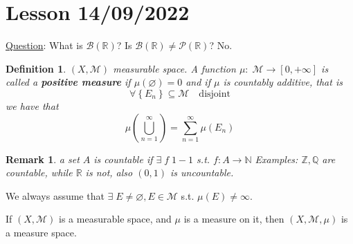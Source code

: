 \documentclass[a4paper,12pt]{article}
\theoremstyle{break}
\newtheorem{remark}[section]{Remark}
\newtheorem{definition}{Definition}[section]
\let\emptyset\varnothing
\newcommand{\boreal}{\mathcal{B}(\mathbb{R})}
\numberwithin{equation}{section}
\begin{document}
\section{Lesson 14/09/2022}
\underline{Question}: What is \(\boreal\)?
Is \(\boreal \not = \mathcal{P}(\mathbb{R})\)? No.
\begin{definition}
    \((X, \mathcal{M})\) measurable space. A function \(\mu : \; \mathcal{M} \to [0, +\infty]\) is called a \textbf{positive measure} if \(\mu(\emptyset) = 0\) and if \(\mu\) is countably additive, that is 
    \[
        \forall \left\lbrace E_n \right\rbrace \subseteq \mathcal{M} \quad \mbox{disjoint}
    \]
    we have that \[
        \mu\left(\bigcup_{n=1}^{\infty}\right) = \sum_{n = 1}^{\infty} \mu(E_n) \tag*{\(\sigma\)-additivity}
    \]
\end{definition}
\begin{remark}
    a set \(A\) is countable if \(\exists \; f \; 1-1\) s.t. \(f: A\to \mathbb{N}\)
Examples: \(\mathbb{Z}, \mathbb{Q}\) are countable, while \(\mathbb{R}\) is not, also \((0,1)\) is uncountable.
\end{remark}
We always assume that \(\exists \; E \not = \emptyset, E \in \mathcal{M}\) s.t. \(\mu(E) \not = \infty\). 

If \((X,\mathcal{M})\) is a measurable space, and \(\mu\) is a measure on it, then \((X, \mathcal{M}, \mu)\) is a measure space.
\end{document}

